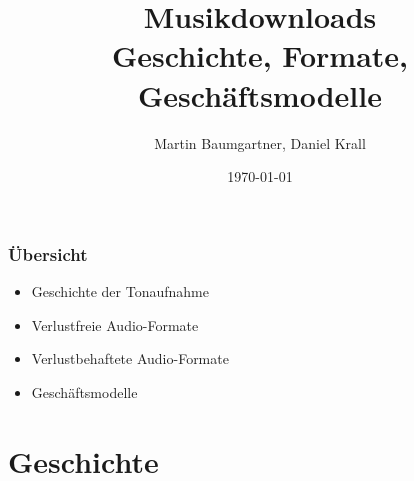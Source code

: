 \documentclass{beamer}
\title [] {Musikdownloads \\ Geschichte, Formate, Geschäftsmodelle}
\author [Baumgartner/Krall] {Martin Baumgartner, Daniel Krall}
\institute[Universität Salzburg]{Universität Salzburg}
\date{\today}
\begin{document}

\begin{frame}
\titlepage

\end{frame}

\begin{frame}
\frametitle{Übersicht}
\begin{itemize}
\Large	
\item  Geschichte der Tonaufnahme
\item  Verlustfreie Audio-Formate
\item  Verlustbehaftete Audio-Formate
\item  Geschäftsmodelle
\end{itemize}
\end{frame}
\section{Geschichte}
\end{document}
